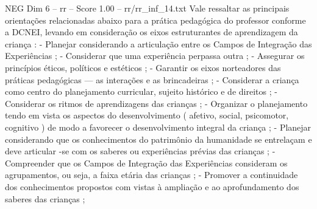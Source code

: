 \begin{textsample}{NEG Dim 6 – rr – Score 1.00 – rr/rr\_inf\_14.txt}
Vale ressaltar as principais orientações relacionadas abaixo para a prática pedagógica do professor conforme a DCNEI, levando em consideração os eixos estruturantes de aprendizagem da criança : - Planejar considerando a articulação entre os Campos de Integração das Experiências ; - Considerar que uma experiência perpassa outra ; - Assegurar os princípios éticos, políticos e estéticos ; - Garantir os eixos norteadores das práticas pedagógicas — as interações e as brincadeiras ; - Considerar a criança como centro do planejamento curricular, sujeito histórico e de direitos ; - Considerar os ritmos de aprendizagens das crianças ; - Organizar o planejamento tendo em vista os aspectos do desenvolvimento ( afetivo, social, psicomotor, cognitivo ) de modo a favorecer o desenvolvimento integral da criança ; - Planejar considerando que os conhecimentos do patrimônio da humanidade se entrelaçam e deve articular -se com os saberes ou experiências prévias das crianças ; - Compreender que os Campos de Integração das Experiências consideram os agrupamentos, ou seja, a faixa etária das crianças ; - Promover a continuidade dos conhecimentos propostos com vistas à ampliação e ao aprofundamento dos saberes das crianças ;

\end{textsample}
